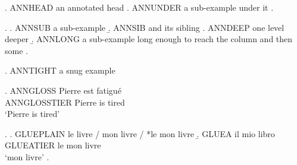 \ex. ANNHEAD an annotated head\exannot{[HP]}
\a. ANNUNDER a sub-example under it\exannot{[IP]}
\z.

\ex.
\a. ANNSUB a sub-example\exannot{[CP]}
\b. ANNSIB and its sibling\exannot{[TP]}
\a. ANNDEEP one level deeper\exannot{[DP]}
\b. ANNLONG a sub-example long enough to reach the column and then some\exannot{[VP]}
\z.

\newlength{\anntightw}
\begingroup
\settowidth{\anntightw}{ANNTIGHT a snug example}
\setlength{\ExAnnotColumn}{\dimexpr\Exindent+\Exlabelwidth+\Exlabelsep
                                  +\anntightw+.4em\relax}
\ex. ANNTIGHT a snug example\exannot{[QP]}
\endgroup

\ex. \gll ANNGLOSS Pierre est fatigu\'e \exannot{[WP]}\\
          ANNGLOSSTIER Pierre is tired\\
     \glt `Pierre is tired'

\ex.
\a. GLUEPLAIN le livre / mon livre / *le mon livre
\b. \gll GLUEA il mio libro\\
         GLUEATIER le mon livre\\
    \glt `mon livre'
\z.

